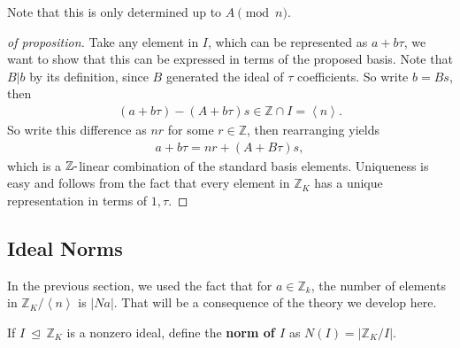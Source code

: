 \begin{remark}

Note that this is only determined up to \(A \pmod n\).

\end{remark}

\begin{proof}[of proposition]

Take any element in \(I\), which can be represented as \(a + b \tau\),
we want to show that this can be expressed in terms of the proposed
basis. Note that \(B\mathrel{\Big|}b\) by its definition, since \(B\)
generated the ideal of \(\tau\) coefficients. So write \(b = Bs\), then
\begin{align*}
( a + b \tau) - (A + b \tau)s \in {\mathbb{Z}}\cap I = \left\langle{ n }\right\rangle 
.\end{align*}
So write this difference as \(nr\) for some \(r\in {\mathbb{Z}}\), then
rearranging yields
\begin{align*}
a + b \tau = nr + (A + B \tau)s
,\end{align*}
which is a \({\mathbb{Z}}{\hbox{-}}\)linear combination of the standard
basis elements. Uniqueness is easy and follows from the fact that every
element in \({\mathbb{Z}}_K\) has a unique representation in terms of
\(1, \tau\).

\end{proof}

\hypertarget{ideal-norms}{%
\subsection{Ideal Norms}\label{ideal-norms}}

\begin{remark}

In the previous section, we used the fact that for
\(a\in {\mathbb{Z}}_k\), the number of elements in
\({\mathbb{Z}}_K / \left\langle{ n }\right\rangle\) is
\({\left\lvert { N a } \right\rvert}\). That will be a consequence of
the theory we develop here.

\end{remark}

\begin{definition}

If \(I{~\trianglelefteq~}{\mathbb{Z}}_K\) is a nonzero ideal, define the
\textbf{norm of \(I\)} as
\(N(I) = {\left\lvert {{\mathbb{Z}}_K / I} \right\rvert}\).

\end{definition}

